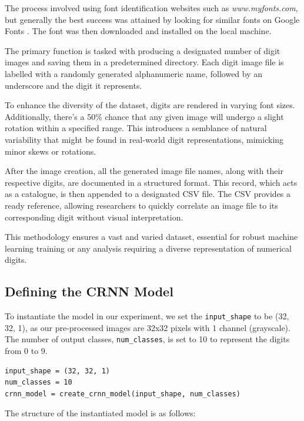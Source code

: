 The process involved using font identification websites such as \textit{www.myfonts.com}\cite{WhatTheFontMyFonts}, but generally the best success was attained by looking for similar fonts on Google Fonts \cite{BrowseFontsGoogle}. The font was then downloaded and installed on the local machine.

The primary function is tasked with producing a designated number of digit images and saving them in a predetermined directory. Each digit image file is labelled with a randomly generated alphanumeric name, followed by an underscore and the digit it represents.

To enhance the diversity of the dataset, digits are rendered in varying font sizes. Additionally, there's a 50\% chance that any given image will undergo a slight rotation within a specified range. This introduces a semblance of natural variability that might be found in real-world digit representations, mimicking minor skews or rotations.

After the image creation, all the generated image file names, along with their respective digits, are documented in a structured format. This record, which acts as a catalogue, is then appended to a designated CSV file. The CSV provides a ready reference, allowing researchers to quickly correlate an image file to its corresponding digit without visual interpretation.

This methodology ensures a vast and varied dataset, essential for robust machine learning training or any analysis requiring a diverse representation of numerical digits.


\subsection{Defining the CRNN Model}


To instantiate the model in our experiment, we set the \texttt{input\_shape} to be (32, 32, 1), as our pre-processed images are 32x32 pixels with 1 channel (grayscale). The number of output classes, \texttt{num\_classes}, is set to 10 to represent the digits from 0 to 9.

\begin{verbatim}
input_shape = (32, 32, 1)
num_classes = 10
crnn_model = create_crnn_model(input_shape, num_classes)
\end{verbatim}

The structure of the instantiated model is as follows:

